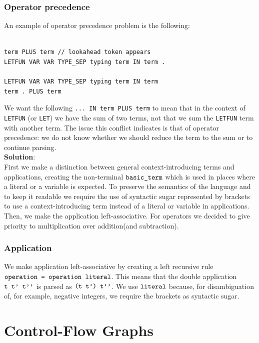 \documentclass[a4paper,11pt]{report}
\begin{document}
\subsubsection{Operator precedence}
	An example of operator precedence problem is the following:
	\begin{lstlisting}

term PLUS term // lookahead token appears
LETFUN VAR VAR TYPE_SEP typing term IN term . 

LETFUN VAR VAR TYPE_SEP typing term IN term 
term . PLUS term 
	\end{lstlisting}
	 We want the following \verb|... IN term PLUS term| to mean that in the context of \verb|LETFUN| (or \verb|LET|) we have the sum of two terms, not that we sum the \verb|LETFUN| term with another term. The issue this conflict indicates is that of operator precedence: we do not know whether we should reduce the term to the sum or to continue parsing. \\
	\textbf{Solution}: \\First we make a distinction between general context-introducing terms and applications, creating the non-terminal $\verb|basic_term|$ which is used in places where a literal or a variable is expected. To preserve the semantics of the language and to keep it readable we require the use of syntactic sugar represented by brackets to use a context-introducing term instead of a literal or variable in applications. Then, we make the application left-associative. For operators we decided to give priority to multiplication over addition(and subtraction).
	
\subsubsection{Application}
We make application left-associative by creating a left recursive rule \\$\verb|operation = operation literal|$.
This means that the double application $\verb|t t' t''|$ is parsed as $\verb|(t t') t''|$. We use $\verb|literal|$ because, for disambiguation of, for example, negative integers, we require the brackets as syntactic sugar. 


\section{Control-Flow Graphs}\label{Section::CFG}
\end{document}
